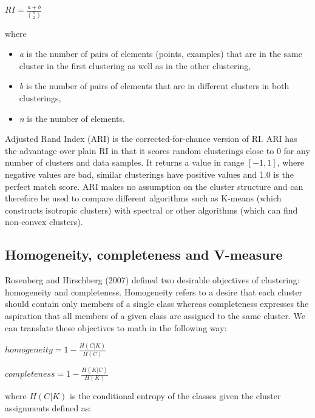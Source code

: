 \documentclass[conference]{IEEEtran}
\begin{document}
$RI = \frac{a+b}{{n \choose 2}}$

where
\begin{itemize}
    \item \textit{a} is the number of pairs of elements (points, examples) that are in the same cluster in the first clustering
    as well as in the other clustering,
    \item \textit{b} is the number of pairs of elements that are in different clusters in both clusterings,
    \item \textit{n} is the number of elements.
\end{itemize}

Adjusted Rand Index (ARI) is the corrected-for-chance version of RI.
ARI has the advantage over plain RI in that it scores random 
clusterings close to 0 for any number of clusters and data samples. It returns
a value in range $[-1, 1]$, where negative values are bad, similar clusterings have
positive values and 1.0 is the perfect match score. ARI makes no assumption on the cluster
structure and can therefore be used to compare different algorithms such as K-means (which
constructs isotropic clusters) with spectral or other algorithms (which can find non-convex
clusters).

\subsection{Homogeneity, completeness and V-measure}
Rosenberg and Hirschberg (2007) defined two desirable objectives of clustering: homogeneity and
completeness. Homogeneity refers to a desire that each cluster should contain only members
of a single class whereas completeness expresses the aspiration that all members of a given
class are assigned to the same cluster.
We can translate these objectives to math in the following way:

$homogeneity = 1 - \frac{H(C|K)}{H(C)}$

$completeness = 1 - \frac{H(K|C)}{H(K)}$

where $H(C|K)$ is the conditional entropy of the classes given the cluster assignments defined as:
\end{document}
